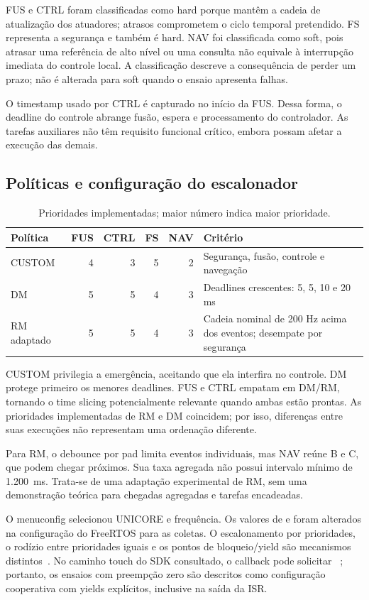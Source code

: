 FUS e CTRL foram classificadas como hard porque mantêm a cadeia de atualização dos atuadores; atrasos comprometem o ciclo temporal pretendido. FS representa a segurança e também é hard. NAV foi classificada como soft, pois atrasar uma referência de alto nível ou uma consulta não equivale à interrupção imediata do controle local. A classificação descreve a consequência de perder um prazo; não é alterada para soft quando o ensaio apresenta falhas.

O timestamp usado por CTRL é capturado no início da FUS. Dessa forma, o deadline do controle abrange fusão, espera e processamento do controlador. As tarefas auxiliares não têm requisito funcional crítico, embora possam afetar a execução das demais.

\subsection{Políticas e configuração do escalonador}

\begin{table}[!htbp]\centering\small
\caption{Prioridades implementadas; maior número indica maior prioridade.}\label{tab:prioridades}
\begin{tabularx}{\linewidth}{lrrrrY}\toprule
Política & FUS & CTRL & FS & NAV & Critério\\\midrule
CUSTOM & 4 & 3 & 5 & 2 & Segurança, fusão, controle e navegação\\
DM & 5 & 5 & 4 & 3 & Deadlines crescentes: 5, 5, 10 e 20 ms\\
RM adaptado & 5 & 5 & 4 & 3 & Cadeia nominal de 200 Hz acima dos eventos; desempate por segurança\\\bottomrule
\end{tabularx}
\par{}
\end{table}

CUSTOM privilegia a emergência, aceitando que ela interfira no controle. DM protege primeiro os menores deadlines. FUS e CTRL empatam em DM/RM, tornando o time slicing potencialmente relevante quando ambas estão prontas. As prioridades implementadas de RM e DM coincidem; por isso, diferenças entre suas execuções não representam uma ordenação diferente.

Para RM, o debounce por pad limita eventos individuais, mas NAV reúne B e C, que podem chegar próximos. Sua taxa agregada não possui intervalo mínimo de 1.200~ms. Trata-se de uma adaptação experimental de RM, sem uma demonstração teórica para chegadas agregadas e tarefas encadeadas.

O menuconfig selecionou UNICORE e frequência. Os valores de  e  foram alterados na configuração do FreeRTOS para as coletas. O escalonamento por prioridades, o rodízio entre prioridades iguais e os pontos de bloqueio/yield são mecanismos distintos~\cite{barry_freertos}. No caminho touch do SDK consultado, o callback pode solicitar ~\cite{idf_touch_driver}; portanto, os ensaios com preempção zero são descritos como configuração cooperativa com yields explícitos, inclusive na saída da ISR.

\FloatBarrier
